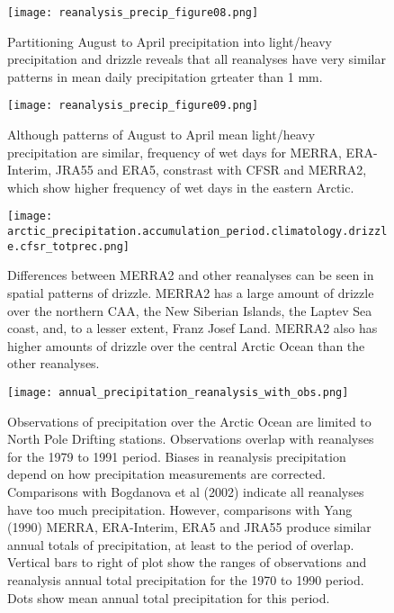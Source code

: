 \documentclass{article}
\begin{document}
\newpage

\begin{figure}[h!]
  \texttt{[image: reanalysis\_precip\_figure08.png]}
  \caption{Partitioning August to April precipitation into light/heavy
    precipitation and drizzle reveals that all reanalyses have very
    similar patterns in mean daily precipitation grteater than 1 mm.}
\end{figure}

\newpage

\begin{figure}[h!]
  \texttt{[image: reanalysis\_precip\_figure09.png]}
  \caption{Although patterns of August to April mean light/heavy precipitation
    are similar, frequency of wet days for MERRA, ERA-Interim, JRA55 and
    ERA5, constrast with CFSR and MERRA2, which show higher frequency of
    wet days in the eastern Arctic.}
\end{figure}

\newpage

\begin{figure}[h!]
  \texttt{[image: arctic\_precipitation.accumulation\_period.climatology.drizzle.cfsr\_totprec.png]}
  \caption{Differences between MERRA2 and other reanalyses can be seen in
    spatial patterns of drizzle.  MERRA2 has a large amount of drizzle over
    the northern CAA, the New Siberian Islands, the Laptev Sea coast, and,
    to a lesser extent, Franz Josef Land. MERRA2 also has higher amounts of
    drizzle over the central Arctic Ocean than the other reanalyses.}
\end{figure}

\newpage

\begin{figure}[h!]
  \texttt{[image: annual\_precipitation\_reanalysis\_with\_obs.png]}
  \caption{Observations of precipitation over the Arctic Ocean are limited to North Pole Drifting stations.  Observations overlap with reanalyses for the 1979 to 1991 period.  Biases in reanalysis precipitation depend on how precipitation measurements are corrected.  Comparisons with Bogdanova et al (2002) indicate all reanalyses have too much precipitation.  However, comparisons with Yang (1990) MERRA, ERA-Interim, ERA5 and JRA55 produce similar annual totals of precipitation, at least to the period of overlap.  Vertical bars to right of plot show the ranges of observations and reanalysis annual total precipitation for the 1970 to 1990 period.  Dots show mean annual total precipitation for this period.}
\end{figure}
\end{document}
